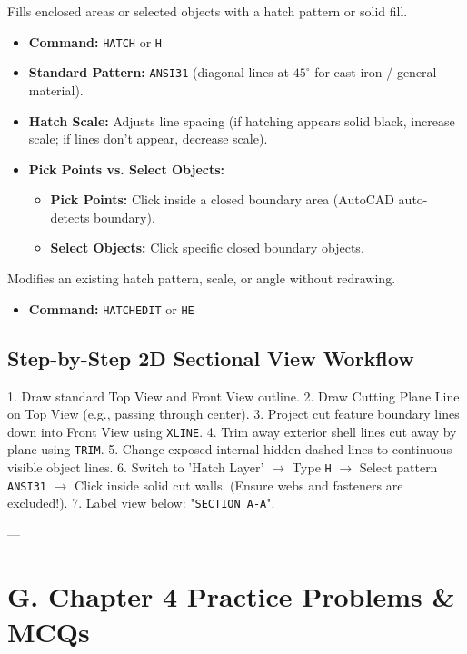 \begin{autocadcmd}[HATCH]
Fills enclosed areas or selected objects with a hatch pattern or solid fill.
\begin{itemize}
    \item \textbf{Command:} \texttt{HATCH} or \texttt{H}
    \item \textbf{Standard Pattern:} \texttt{ANSI31} (diagonal lines at $45^\circ$ for cast iron / general material).
    \item \textbf{Hatch Scale:} Adjusts line spacing (if hatching appears solid black, increase scale; if lines don't appear, decrease scale).
    \item \textbf{Pick Points vs. Select Objects:}
    \begin{itemize}
        \item \textbf{Pick Points:} Click inside a closed boundary area (AutoCAD auto-detects boundary).
        \item \textbf{Select Objects:} Click specific closed boundary objects.
    \end{itemize}
\end{itemize}
\end{autocadcmd}

\begin{autocadcmd}[HATCHEDIT]
Modifies an existing hatch pattern, scale, or angle without redrawing.
\begin{itemize}
    \item \textbf{Command:} \texttt{HATCHEDIT} or \texttt{HE}
\end{itemize}
\end{autocadcmd}

\subsection{Step-by-Step 2D Sectional View Workflow}
1. Draw standard Top View and Front View outline.
2. Draw Cutting Plane Line on Top View (e.g., passing through center).
3. Project cut feature boundary lines down into Front View using \texttt{XLINE}.
4. Trim away exterior shell lines cut away by plane using \texttt{TRIM}.
5. Change exposed internal hidden dashed lines to continuous visible object lines.
6. Switch to 'Hatch Layer' $\to$ Type \texttt{H} $\to$ Select pattern \texttt{ANSI31} $\to$ Click inside solid cut walls. (Ensure webs and fasteners are excluded!).
7. Label view below: "\texttt{SECTION A-A}".

---

\section{G. Chapter 4 Practice Problems \& MCQs}

